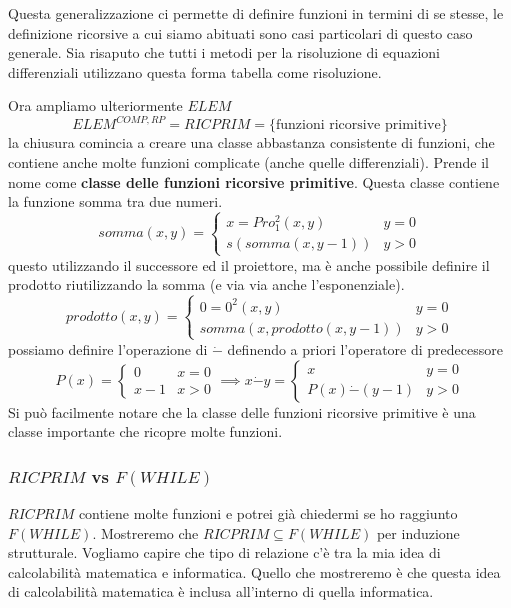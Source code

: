 \documentclass{article}
\begin{document}
Questa generalizzazione ci permette di definire funzioni in termini di se stesse, le
definizione ricorsive a cui siamo abituati sono casi particolari di questo caso generale. Sia
risaputo che tutti i metodi per la risoluzione di equazioni differenziali utilizzano
questa forma tabella come risoluzione.

Ora ampliamo ulteriormente $ELEM$
$$ELEM^{COMP,RP}=RICPRIM=\{\text{funzioni ricorsive primitive}\}$$
la chiusura comincia a creare una classe abbastanza consistente di funzioni, che contiene
anche molte funzioni complicate (anche quelle differenziali). Prende il nome come
\textbf{classe delle funzioni ricorsive primitive}. Questa classe contiene la funzione
somma tra due numeri.
\[
    somma(x,y)=
    \begin{cases}
        x=Pro^2_1(x,y)  & y=0 \\
        s(somma(x,y-1)) & y>0
    \end{cases}
\]
questo utilizzando il successore ed il proiettore, ma è anche possibile definire il prodotto
riutilizzando la somma (e via via anche l'esponenziale).
\[
    prodotto(x,y)=
    \begin{cases}
        0=0^2(x,y)                & y=0 \\
        somma(x, prodotto(x,y-1)) & y>0
    \end{cases}
\]
possiamo definire l'operazione di $\dot{-}$ definendo a priori l'operatore di predecessore
\[
    P(x)=
    \begin{cases}
        0   & x=0 \\
        x-1 & x>0
    \end{cases}
    \implies
    x\dot{-}y=
    \begin{cases}
        x                & y=0 \\
        P(x)\dot{-}(y-1) & y>0
    \end{cases}
\]
Si può facilmente notare che la classe delle funzioni ricorsive primitive è una classe
importante che ricopre molte funzioni.

\subsubsection{$RICPRIM$ vs $F(WHILE)$}
$RICPRIM$ contiene molte funzioni e potrei già chiedermi se ho raggiunto $F(WHILE)$. Mostreremo
che $RICPRIM\subseteq F(WHILE)$ per induzione strutturale. Vogliamo capire che tipo di relazione
c'è tra la mia idea di calcolabilità matematica e informatica. Quello che mostreremo
è che questa idea di calcolabilità matematica è inclusa all'interno di quella informatica.
\end{document}
